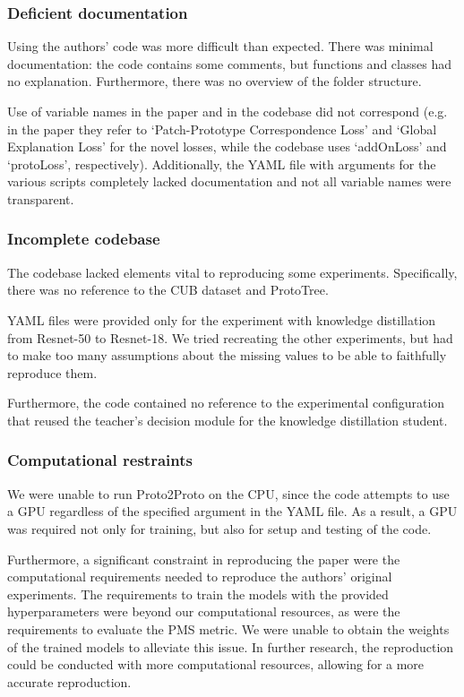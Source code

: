 \subsubsection{Deficient documentation}
Using the authors' code was more difficult than expected. There was minimal documentation: the code contains some comments, but functions and classes had no explanation. Furthermore, there was no overview of the folder structure.\par
Use of variable names in the paper and in the codebase did not correspond (e.g. in the paper they refer to `Patch-Prototype Correspondence Loss' and `Global Explanation Loss' for the novel losses, while the codebase uses `addOnLoss' and `protoLoss', respectively). Additionally, the YAML file with arguments for the various scripts completely lacked documentation and not all variable names were transparent. 

\subsubsection{Incomplete codebase}

The codebase lacked elements vital to reproducing some experiments. Specifically, there was no reference to the CUB dataset and ProtoTree.

YAML files were provided only for the experiment with knowledge distillation from Resnet-50 to Resnet-18. We tried recreating the other experiments, but had to make too many assumptions about the missing values to be able to faithfully reproduce them.\par
Furthermore, the code contained no reference to the experimental configuration that reused the teacher's decision module for the knowledge distillation student. 

\subsubsection{Computational restraints}
We were unable to run Proto2Proto on the CPU, since the code attempts to use a GPU regardless of the specified argument in the YAML file. As a result, a GPU was required not only for training, but also for setup and testing of the code.

Furthermore, a significant constraint in reproducing the paper were the computational requirements needed to reproduce the authors' original experiments. The requirements to train the models with the provided hyperparameters were beyond our computational resources, as were the requirements to evaluate the PMS metric. We were unable to obtain the weights of the trained models to alleviate this issue. In further research, the reproduction could be conducted with more computational resources, allowing for a more accurate reproduction.\par

